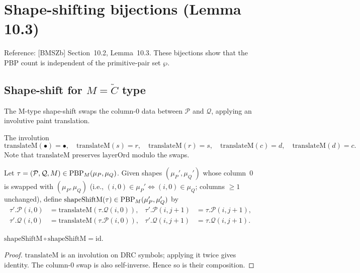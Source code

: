\chapter{Shape-shifting bijections (Lemma 10.3)}
\label{chap:shape_shift}

Reference: [BMSZb] Section~10.2, Lemma~10.3. These bijections show that the
PBP count is independent of the primitive-pair set $\wp$.

\section{Shape-shift for $M = \tilde{C}$ type}

The M-type shape-shift swaps the column-0 data between $\mathcal{P}$ and
$\mathcal{Q}$, applying an involutive paint translation.

\begin{definition}
  \label{def:translateM}
  \leanok
  The involution
  \[ \mathrm{translateM}(\bullet) = \bullet,\quad \mathrm{translateM}(s) = r,\quad \mathrm{translateM}(r) = s,\quad \mathrm{translateM}(c) = d,\quad \mathrm{translateM}(d) = c. \]
  Note that $\mathrm{translateM}$ preserves $\mathrm{layerOrd}$ modulo the swaps.
\end{definition}

\begin{definition}
  \label{def:shapeShiftM}
  \leanok
  Let $\tau = (\mathcal{P}, \mathcal{Q}, M) \in \mathrm{PBP}_M(\mu_P, \mu_Q)$. Given
  shapes $(\mu_P', \mu_Q')$ whose column~0 is swapped with $(\mu_P, \mu_Q)$
  (i.e., $(i, 0) \in \mu_P' \iff (i, 0) \in \mu_Q$; columns $\geq 1$ unchanged),
  define $\mathrm{shapeShiftM}(\tau) \in \mathrm{PBP}_M(\mu_P', \mu_Q')$ by
  \begin{align*}
    \tau'.\mathcal{P}(i, 0) &= \mathrm{translateM}(\tau.\mathcal{Q}(i, 0)), &
    \tau'.\mathcal{P}(i, j+1) &= \tau.\mathcal{P}(i, j+1), \\
    \tau'.\mathcal{Q}(i, 0) &= \mathrm{translateM}(\tau.\mathcal{P}(i, 0)), &
    \tau'.\mathcal{Q}(i, j+1) &= \tau.\mathcal{Q}(i, j+1).
  \end{align*}
\end{definition}

\begin{lemma}
  \label{lem:shapeShiftM_involution}
  \leanok
  $\mathrm{shapeShiftM} \circ \mathrm{shapeShiftM} = \mathrm{id}$.
\end{lemma}
\begin{proof}
  \leanok
  $\mathrm{translateM}$ is an involution on DRC symbols; applying it twice
  gives identity. The column-0 swap is also self-inverse. Hence so is their
  composition.
\end{proof}

